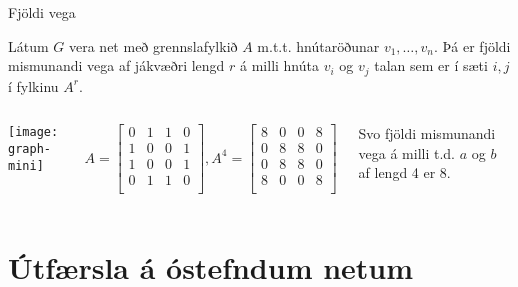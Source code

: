 \documentclass{beamer}
\begin{document}
\begin{frame}{Fjöldi vega}
	\begin{tcolorbox}
		Látum $G$ vera net með grennslafylkið $A$ m.t.t. hnútaröðunar $v_1, \ldots, v_n$. Þá er fjöldi mismunandi vega af jákvæðri lengd $r$ á milli hnúta $v_i$ og $v_j$ talan sem er í sæti $i,j$ í fylkinu $A^r$.
	\end{tcolorbox}
	\begin{columns}
		\begin{center}
			\texttt{[image: graph-mini]}
		\end{center}
		\[
			A =
			\begin{bmatrix}
				0 & 1 & 1 & 0 \\
				1 & 0 & 0 & 1 \\
				1 & 0 & 0 & 1 \\
				0 & 1 & 1 & 0 \\
			\end{bmatrix}
			,
			A^4 =
			\begin{bmatrix}
				8 & 0 & 0 & 8 \\
				0 & 8 & 8 & 0 \\
				0 & 8 & 8 & 0 \\
				8 & 0 & 0 & 8 \\
			\end{bmatrix}
		\]
		\begin{center}
			Svo fjöldi mismunandi vega á milli t.d. $a$ og $b$ af lengd 4 er 8.
		\end{center}
	\end{columns}
\end{frame}

\section{Útfærsla á óstefndum netum}

\end{document}
